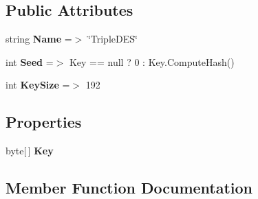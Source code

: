 \subsection*{Public Attributes}
\begin{DoxyCompactItemize}
\item 
string {\bfseries Name} =$>$ \char`\"{}Triple\+D\+ES\char`\"{}\hypertarget{class_stegosaurus_1_1_cryptography_1_1_triple_d_e_s_provider_a4ddc2254ae71540da33ef00ce4e49b8d}{}\label{class_stegosaurus_1_1_cryptography_1_1_triple_d_e_s_provider_a4ddc2254ae71540da33ef00ce4e49b8d}

\item 
int {\bfseries Seed} =$>$ Key == null ? 0 \+: Key.\+Compute\+Hash()\hypertarget{class_stegosaurus_1_1_cryptography_1_1_triple_d_e_s_provider_a427769de0c0cca31e102d8ba446fafc9}{}\label{class_stegosaurus_1_1_cryptography_1_1_triple_d_e_s_provider_a427769de0c0cca31e102d8ba446fafc9}

\item 
int {\bfseries Key\+Size} =$>$ 192\hypertarget{class_stegosaurus_1_1_cryptography_1_1_triple_d_e_s_provider_a5f69d616171d12dedc4f857d18183f0e}{}\label{class_stegosaurus_1_1_cryptography_1_1_triple_d_e_s_provider_a5f69d616171d12dedc4f857d18183f0e}

\end{DoxyCompactItemize}
\subsection*{Properties}
\begin{DoxyCompactItemize}
\item 
byte\mbox{[}$\,$\mbox{]} {\bfseries Key}\hypertarget{class_stegosaurus_1_1_cryptography_1_1_triple_d_e_s_provider_af5d4438d8c3928502812e977d8c566ae}{}\label{class_stegosaurus_1_1_cryptography_1_1_triple_d_e_s_provider_af5d4438d8c3928502812e977d8c566ae}

\end{DoxyCompactItemize}


\subsection{Member Function Documentation}
